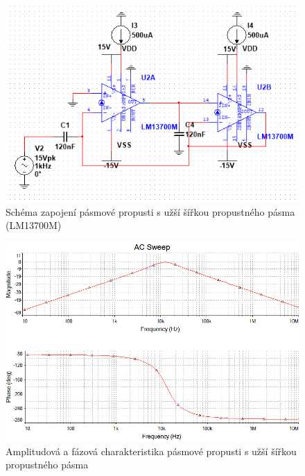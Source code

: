 \documentclass[twoside]{article}
\begin{document}
\begin{figure}[H]
\centering
\includegraphics[scale=0.75]{uzkybpschema.png}
\caption{Schéma zapojení pásmové propusti s užší šířkou propustného pásma (LM13700M)}
\end{figure}
\begin{figure}[H]
\centering
\includegraphics[scale=0.75]{uzkybp.png}
\caption{Amplitudová a fázová charakteristika pásmové propusti s užší šířkou propustného pásma}
\end{figure}
\end{document}
